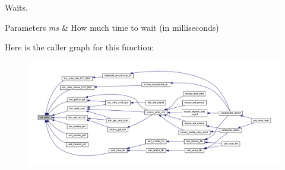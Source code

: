 Waits. 


\begin{DoxyParams}{Parameters}
{\em ms} & How much time to wait (in milliseconds) \\
\hline
\end{DoxyParams}
Here is the caller graph for this function\+:\nopagebreak
\begin{figure}[H]
\begin{center}
\leavevmode
\includegraphics[width=350pt]{group__keyboard_ga686f8d95e71a43edaddda1db8b78caa4_icgraph}
\end{center}
\end{figure}
